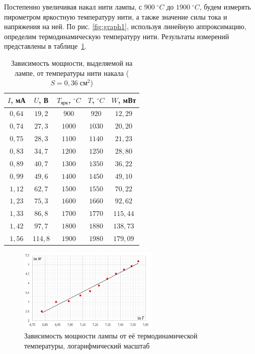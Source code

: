 \documentclass[a4paper]{article}
\begin{document}
Постепенно увеличивая накал нити лампы, с $900 \; ^\circ C$ до $1900 \; ^\circ C$, будем измерять пирометром яркостную температуру нити, а также значение силы тока и напряжения на ней. По рис. \ref{fig:graph1}, используя линейную аппроксимацию, определим термодинамическую температуру нити. Результаты измерений представлены в таблице~\ref*{table:res1}.

\begin{table}[!ht]
    \centering
    \begin{tabular}{|c|c|c|c|c|}
    \hline
    $I$, мА & $U$, В  & $T_{\text{ярк}}$, $^\circ C$ & $T$, $^\circ C$ & $W$, мВт \\ \hline
    $0,64$  & $19,2$  & $900$                        & $920$           & $12,29$  \\ \hline
    $0,74$  & $27,3$  & $1000$                       & $1030$          & $20,20$  \\ \hline
    $0,75$  & $28,3$  & $1100$                       & $1140$          & $21,23$  \\ \hline
    $0,83$  & $34,7$  & $1200$                       & $1250$          & $28,80$  \\ \hline
    $0,89$  & $40,7$  & $1300$                       & $1350$          & $36,22$  \\ \hline
    $0,99$  & $49,6$  & $1400$                       & $1450$          & $49,10$  \\ \hline
    $1,12$  & $62,7$  & $1500$                       & $1550$          & $70,22$  \\ \hline
    $1,23$  & $75,3$  & $1600$                       & $1660$          & $92,62$  \\ \hline
    $1,33$  & $86,8$  & $1700$                       & $1770$          & $115,44$ \\ \hline
    $1,42$  & $97,7$  & $1800$                       & $1880$          & $138,73$ \\ \hline
    $1,56$  & $114,8$ & $1900$                       & $1980$          & $179,09$ \\ \hline
    \end{tabular}
    \caption{Зависимость мощности, выделяемой на лампе, от температуры нити накала ($S = 0,36 \; \text{см}^2$)}
    \label{table:res1}
    \end{table}

    \begin{figure}[ht!]
        \centering
        \includegraphics[width = 0.6\textwidth]{image/graph2.png}
        \caption{Зависимость мощности лампы от её термодинамической температуры, логарифмический масштаб}
        \label{fig:graph2}
    \end{figure}
\end{document}

